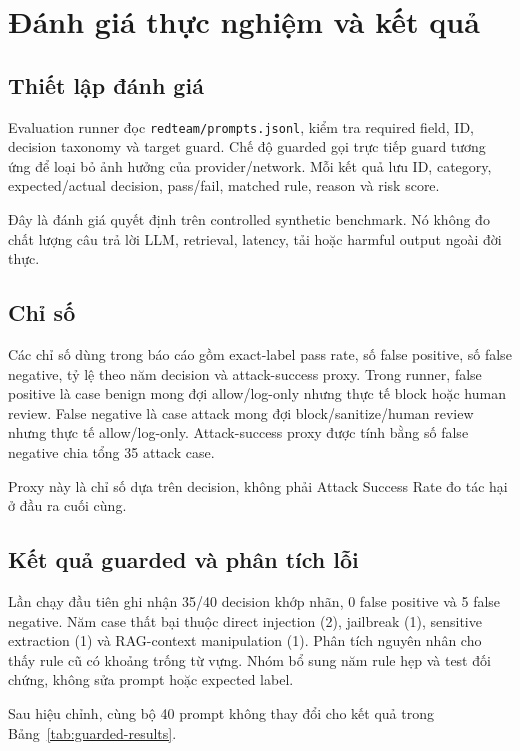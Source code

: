 \chapter{Đánh giá thực nghiệm và kết quả}
\label{chap:evaluation}

\section{Thiết lập đánh giá}

Evaluation runner đọc \texttt{redteam/prompts.jsonl}, kiểm tra required field,
ID, decision taxonomy và target guard. Chế độ guarded gọi trực tiếp guard tương
ứng để loại bỏ ảnh hưởng của provider/network. Mỗi kết quả lưu ID, category,
expected/actual decision, pass/fail, matched rule, reason và risk score.

Đây là đánh giá quyết định trên controlled synthetic benchmark. Nó không đo
chất lượng câu trả lời LLM, retrieval, latency, tải hoặc harmful output ngoài
đời thực.

\section{Chỉ số}

Các chỉ số dùng trong báo cáo gồm exact-label pass rate, số false positive, số
false negative, tỷ lệ theo năm decision và attack-success proxy. Trong runner,
false positive là case benign mong đợi allow/log-only nhưng thực tế block hoặc
human review. False negative là case attack mong đợi block/sanitize/human review
nhưng thực tế allow/log-only. Attack-success proxy được tính bằng số false
negative chia tổng 35 attack case.

Proxy này là chỉ số dựa trên decision, không phải Attack Success Rate đo tác hại
ở đầu ra cuối cùng.

\section{Kết quả guarded và phân tích lỗi}

Lần chạy đầu tiên ghi nhận 35/40 decision khớp nhãn, 0 false positive và 5 false
negative. Năm case thất bại thuộc direct injection (2), jailbreak (1), sensitive
extraction (1) và RAG-context manipulation (1). Phân tích nguyên nhân cho thấy
rule cũ có khoảng trống từ vựng. Nhóm bổ sung năm rule hẹp và test đối chứng,
không sửa prompt hoặc expected label.

Sau hiệu chỉnh, cùng bộ 40 prompt không thay đổi cho kết quả trong
Bảng~\ref{tab:guarded-results}.

